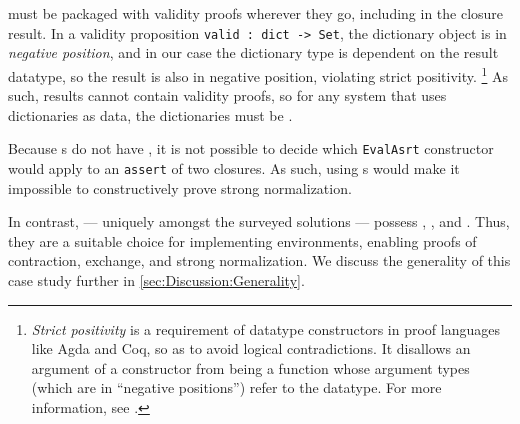 \Cals{} must be packaged with validity proofs wherever they go, including in the closure result.
In a validity proposition \texttt{valid : dict -> Set},
%
%
the dictionary object is in \emph{negative position},
and in our case the dictionary type is dependent on the result datatype,
so the result is also in negative position, violating strict positivity.%
\footnote{
\emph{Strict positivity} is a requirement of datatype constructors in proof languages like Agda and Coq, so as to avoid logical contradictions.
%
It disallows an argument of a constructor from being a function whose argument types (which are in ``negative positions'') refer to the datatype.
%
For more information, see \citep{positivity}.
}
As such, results cannot contain validity proofs, so for any system that uses dictionaries as data,
the dictionaries must be \semanticallyTotal.

Because \fpf{}s do not have \EqDec, it is not possible to decide which \texttt{EvalAsrt} constructor would
apply to an \texttt{assert} of two closures. As such, using \fpf{}s would make it impossible to constructively prove strong normalization.

In contrast, \dds{} --- uniquely amongst the surveyed solutions --- possess \SemTot, \SemInj, and \EqDec.
%
Thus, they are a suitable choice for implementing environments, enabling proofs of contraction, exchange, and strong normalization.
%
We discuss the generality of this case study further in \autoref{sec:Discussion:Generality}.
